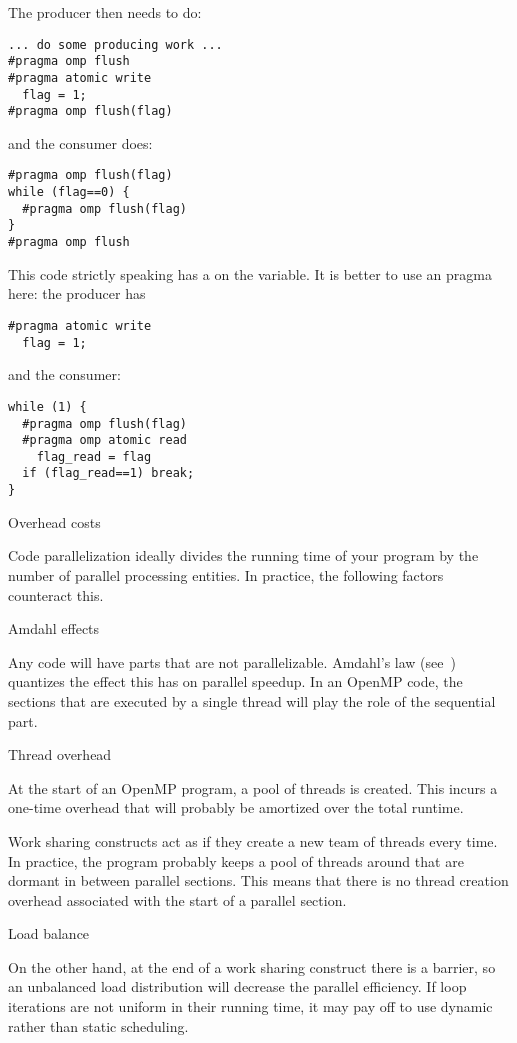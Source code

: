 The producer then needs to do:
\begin{verbatim}
... do some producing work ...
#pragma omp flush
#pragma atomic write
  flag = 1;
#pragma omp flush(flag)
\end{verbatim}
and the consumer does:
\begin{verbatim}
#pragma omp flush(flag)
while (flag==0) {
  #pragma omp flush(flag)
}
#pragma omp flush
\end{verbatim}
This code strictly speaking has a  on the  variable.
It is better to use an  pragma here: the producer has
\begin{verbatim}
#pragma atomic write
  flag = 1;
\end{verbatim}
and the consumer:
\begin{verbatim}
while (1) {
  #pragma omp flush(flag)
  #pragma omp atomic read
    flag_read = flag
  if (flag_read==1) break;
}
\end{verbatim}

 {Overhead costs}

Code parallelization ideally divides the running time of your program
by the number of parallel processing entities. In practice, the following
factors counteract this.

 {Amdahl effects}

Any code will have parts that are not parallelizable. Amdahl's law
(see~) quantizes the effect this has on parallel speedup.
In an OpenMP code, the sections that are executed by a single thread
will play the role of the sequential part.

 {Thread overhead}

At the start of an OpenMP program, a pool of threads is created. This
incurs a one-time overhead that will probably be amortized over the
total runtime.

Work sharing constructs act as if they create a new team of threads every time.
In practice, the program probably keeps a pool of threads around that are dormant
in between parallel sections. This means that there is no thread creation overhead
associated with the start of a parallel section.

 {Load balance}

On the other hand, at the end of a work sharing construct there is a barrier,
so an unbalanced load distribution will decrease the parallel efficiency.
If loop iterations are not uniform in their running time, it may pay off
to use dynamic rather than static scheduling.


